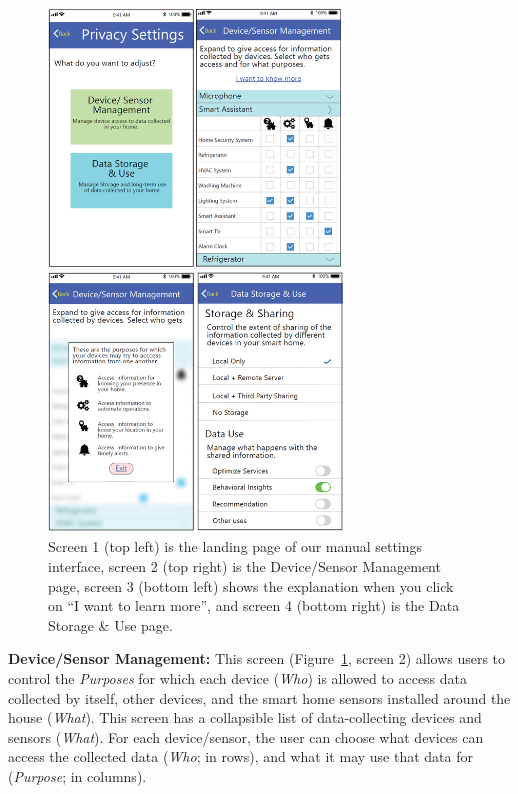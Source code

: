 \begin{figure}
	\centering
	\includegraphics[width=0.7\textwidth]{figures/interface_new.png}
	\caption{Screen 1 (top left) is the landing page of our manual settings interface, screen 2 (top right) is the Device/Sensor Management page, screen 3 (bottom left) shows the explanation when you click on ``I want to learn more'', and screen 4 (bottom right) is the Data Storage \& Use page.}
	\label{fig:interface2}
\end{figure}

\textbf{Device/Sensor Management:} This screen (Figure~\ref{fig:interface2}, screen 2) allows users to control the \emph{Purposes} for which each device (\emph{Who}) is allowed to access data collected by itself, other devices, and the smart home sensors installed around the house (\emph{What}). This screen has a collapsible list of data-collecting devices and sensors (\emph{What}). For each device/sensor, the user can choose what devices can access the collected data (\emph{Who}; in rows), and what it may use that data for (\emph{Purpose}; in columns).

